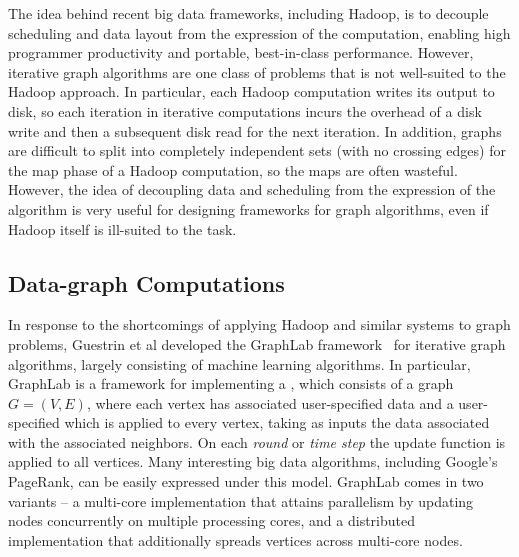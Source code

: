 The idea behind recent big data frameworks, including Hadoop, 
is to decouple scheduling and
data layout from the expression of the computation, enabling high
programmer productivity and portable, best-in-class performance.
However, iterative graph algorithms are one class of problems that
is not well-suited to the Hadoop approach. In particular, each 
Hadoop computation writes its output to disk, so each iteration 
in iterative computations incurs the overhead of a disk write 
and then a subsequent disk read for the next iteration. In 
addition, graphs are difficult to split into completely 
independent sets (with no crossing edges) for the map phase 
of a Hadoop computation, so the maps are often wasteful.
However, the idea of decoupling data and scheduling from the expression of
the algorithm is very useful for designing frameworks
for graph algorithms, even if Hadoop itself is ill-suited to 
the task.  






\subsection{Data-graph Computations}

In response to the shortcomings of applying Hadoop and similar systems
to graph problems, 
Guestrin et al developed the GraphLab 
framework~\cite{LowBiGo12} for iterative graph algorithms, 
largely consisting of machine learning algorithms. 
In particular, GraphLab is a framework for implementing a
, which consists of a graph $G=(V,E)$,
where each vertex has associated user-specified data and a user-specified 
 which is applied to every vertex, taking
as inputs the data associated with the associated neighbors.  On each
\emph{round} or \emph{time step} the update function is applied to
all vertices.  Many interesting big data algorithms, including Google's 
PageRank, can be easily expressed under this model. GraphLab 
comes in two variants -- a multi-core implementation that 
attains parallelism by updating nodes concurrently on multiple 
processing cores, and a distributed implementation that 
additionally spreads vertices across multi-core nodes.


